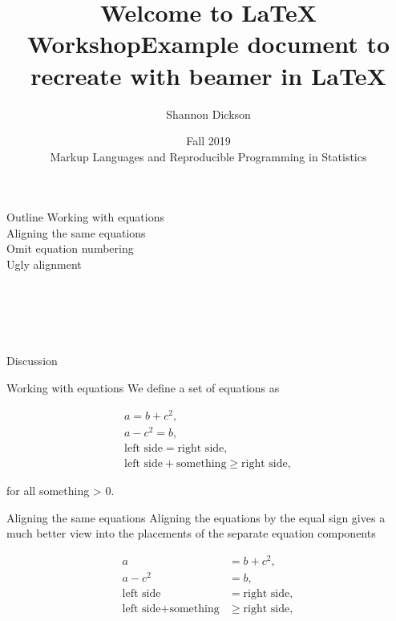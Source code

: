\documentclass[
  10pt,
  ignorenonframetext,
]{beamer}
\title{Welcome to \LaTeX{} Workshop}
\title{Example document to recreate with beamer in \LaTeX}
\author{Shannon Dickson}
\date{Fall 2019\\
Markup Languages and Reproducible Programming in Statistics}
\begin{document}
\frame{\titlepage}

\begin{frame}{Outline}
\protect\hypertarget{outline}{}
Working with equations\\
\hspace*{0.333em}\hspace*{0.333em}\hspace*{0.333em}\hspace*{0.333em}Aligning
the same equations\\
\hspace*{0.333em}\hspace*{0.333em}\hspace*{0.333em}\hspace*{0.333em}Omit
equation numbering\\
\hspace*{0.333em}\hspace*{0.333em}\hspace*{0.333em}\hspace*{0.333em}Ugly
alignment\\
\strut \\
\strut \\
\strut \\

Discussion
\end{frame}

\begin{frame}{Working with equations}
\protect\hypertarget{working-with-equations}{}
We define a set of equations as

\begin{gather}
a = b + c^2,\\
a - c^2 = b,\\
\textrm{left side} = \textrm{right side},\\
\textrm{left side} + \textrm{something} \geq \textrm{right side}, 
\end{gather}

for all something \textgreater{} 0.
\end{frame}

\begin{frame}{Aligning the same equations}
\protect\hypertarget{aligning-the-same-equations}{}
Aligning the equations by the equal sign gives a much better view into
the placements of the separate equation components

\begin{align} 
a &= b + c^2,\\
a - c^2 &= b,\\
\textrm{left side} &= \textrm{right side},\\
\textrm{left side} + \textrm{something} &\geq \textrm{right side},
\end{align}
\end{frame}
\end{document}
